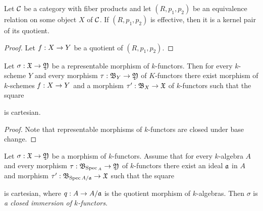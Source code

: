 \begin{proposition}
Let ${\mathcal C}$ be a category with fiber products and let $(R,p_1,p_2)$ be an equivalence relation on some object $X$ of ${\mathcal C}$. If $(R,p_1,p_2)$ is effective, then it is a kernel pair of its quotient.
\end{proposition}
\begin{proof}
Let $f:X\rightarrow Y$ be a quotient of $(R,p_1,p_2)$.
\end{proof}

\begin{proposition}
Let $\sigma:{\mathfrak X}\rightarrow {\mathfrak Y}$ be a representable morphism of $k$-functors. Then for every $k$-scheme $Y$ and every morphism $\tau:{\mathfrak B}_Y\rightarrow {\mathfrak Y}$ of $K$-functors there exist morphism of $k$-schemes $f:X\rightarrow Y$ and a morphism $\tau':{\mathfrak B}_X\rightarrow {\mathfrak X}$ of $k$-functors such that the square 
\begin{center}
\end{center}
is cartesian.
\end{proposition}
\begin{proof}
Note that representable morphisms of $k$-functors are closed under base change.
\end{proof}

\begin{definition}
Let $\sigma:{\mathfrak X}\rightarrow {\mathfrak Y}$ be a morphism of $k$-functors. Assume that for every $k$-algebra $A$ and every morphism $\tau:{\mathfrak B}_{\mathrm{Spec}\,_A}\rightarrow {\mathfrak Y}$ of $k$-functors there exist an ideal $\mathfrak{a}$ in $A$ and morphism $\tau':{\mathfrak B}_{\mathrm{Spec}\, A/\mathfrak{a}}\rightarrow {\mathfrak X}$ such that the square
\begin{center}
\end{center}
is cartesian, where $q:A\rightarrow A/\mathfrak{a}$ is the quotient morphism of $k$-algebras. Then $\sigma$ is \textit{a closed immersion of $k$-functors}.
\end{definition}






